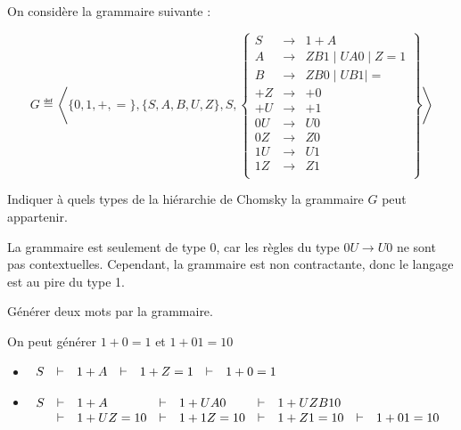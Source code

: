 
\begingroup

\begin{exercice}\label{exo:languages/grammars/general}

  On considère la grammaire suivante :

  $$G \eqdef \left\langle \{0, 1, +, =\}, \{S, A, B, U, Z\}, S,
  \left\{\begin{array}{lll}
  S   &\rightarrow& 1 + A \\
  A &\rightarrow& Z B 1 \mid U A 0 \mid Z = 1 \\
  B &\rightarrow& Z B 0 \mid U B 1 \mid = \\
  +Z  &\rightarrow& +0 \\
  +U  &\rightarrow& +1 \\
  0U &\rightarrow& U0 \\
  0Z &\rightarrow& Z0 \\
  1U &\rightarrow& U1 \\
  1Z &\rightarrow& Z1 \\
  \end{array}\right\}\right\rangle$$

  \begin{questions}
  \item Indiquer à quels types de la hiérarchie de Chomsky la grammaire $G$ peut appartenir.
  \end{questions}
  \begin{corrections}
    La grammaire est seulement de type 0, car les règles du type $0U \rightarrow U0$ ne sont  pas contextuelles.
    Cependant, la grammaire est non contractante, donc le langage est au pire du type 1. 
  \end{corrections}
  
  \begin{questions}
  \item Générer deux mots par la grammaire.
  \end{questions}
  \begin{corrections}
    On peut générer $1+0=1$ et $1+01=10$
    \begin{itemize}
    \item $\begin{array}[t]{rclclclcl}
      S
      &\vdash& 1+A 
      &\vdash& 1+Z=1 
      &\vdash& 1+0=1
    \end{array}$
    \item $\begin{array}[t]{rclclclcl}
      S
      &\vdash& 1+A 
      &\vdash& 1+UA0 
      &\vdash& 1+UZB10 \\
      &\vdash& 1+UZ=10 
      &\vdash& 1+1Z=10 
      &\vdash& 1+Z1=10 
      &\vdash& 1+01=10
    \end{array}$
    \end{itemize}
  \end{corrections}
  

\end{exercice}
